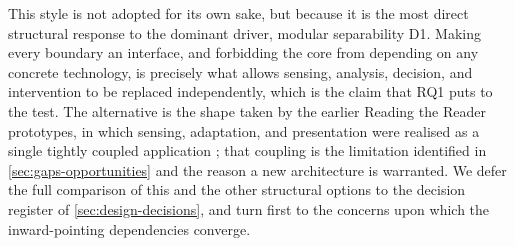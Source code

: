 This style is not adopted for its own sake, but because it is the most direct structural response to the dominant driver, modular separability D1.
Making every boundary an interface, and forbidding the core from depending on any concrete technology, is precisely what allows sensing, analysis, decision, and intervention to be replaced independently, which is the claim that RQ1 puts to the test.
The alternative is the shape taken by the earlier Reading the Reader prototypes, in which sensing, adaptation, and presentation were realised as a single tightly coupled application \cite{refsgaard2024rtr, pereira2024typography, palinec2024reactive}; that coupling is the limitation identified in \cref{sec:gaps-opportunities} and the reason a new architecture is warranted.
We defer the full comparison of this and the other structural options to the decision register of \cref{sec:design-decisions}, and turn first to the concerns upon which the inward-pointing dependencies converge.
